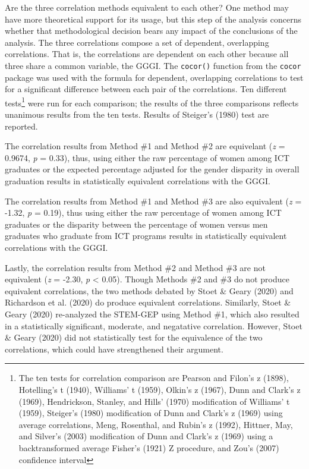 \documentclass[]{book}
\begin{document}
Are the three correlation methods equivalent to each other? One method
may have more theoretical support for its usage, but this step of the
analysis concerns whether that methodological decision bears any impact
of the conclusions of the analysis. The three correlations compose a set
of dependent, overlapping correlations. That is, the correlations are
dependent on each other because all three share a common variable, the
GGGI. The \texttt{cocor()} function from the \texttt{cocor} package
\citep{diedenhofenCocorComprehensiveSolution2015} was used with the
formula for dependent, overlapping correlations to test for a
significant difference between each pair of the correlations. Ten
different tests\footnote{The ten tests for correlation comparison are
  Pearson and Filon's z (1898), Hotelling's t (1940), Williams' t
  (1959), Olkin's z (1967), Dunn and Clark's z (1969), Hendrickson,
  Stanley, and Hills' (1970) modification of Williams' t (1959),
  Steiger's (1980) modification of Dunn and Clark's z (1969) using
  average correlations, Meng, Rosenthal, and Rubin's z (1992), Hittner,
  May, and Silver's (2003) modification of Dunn and Clark's z (1969)
  using a backtransformed average Fisher's (1921) Z procedure, and Zou's
  (2007) confidence interval} were run for each comparison; the results
of the three comparisons reflects unanimous results from the ten tests.
Results of Steiger's (1980) test are reported.

The correlation results from Method \#1 and Method \#2 are equivelant
(\emph{z} = 0.9674, \emph{p} = 0.33), thus, using either the raw
percentage of women among ICT graduates or the expected percentage
adjusted for the gender disparity in overall graduation results in
statistically equivalent correlations with the GGGI.

The correlation results from Method \#1 and Method \#3 are also
equivalent (\emph{z} = -1.32, \emph{p} = 0.19), thus using either the
raw percentage of women among ICT graduates or the disparity between the
percentage of women versus men graduates who graduate from ICT programs
results in statistically equivalent correlations with the GGGI.

Lastly, the correlation results from Method \#2 and Method \#3 are not
equivalent (\emph{z} = -2.30, \emph{p} \textless{} 0.05). Though Methods
\#2 and \#3 do not produce equivalent correlations, the two methods
debated by Stoet \& Geary (2020) and Richardson et al. (2020) do produce
equivalent correlations. Similarly, Stoet \& Geary (2020) re-analyzed
the STEM-GEP using Method \#1, which also resulted in a statistically
significant, moderate, and negatative correlation. However, Stoet \&
Geary (2020) did not statistically test for the equivalence of the two
correlations, which could have strengthened their argument.
\end{document}
